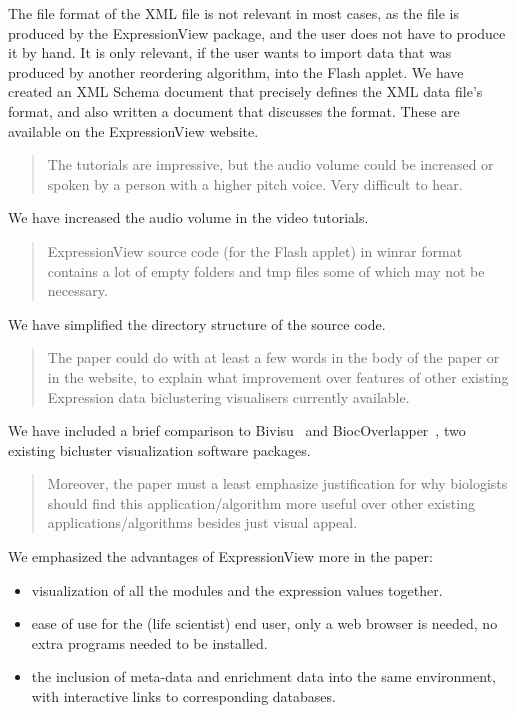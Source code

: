 \documentclass[a4paper]{article}
\newenvironment{myquote}{\begin{quote}\color{blue}}{\end{quote}}
\begin{document}
The file format of the XML file is not relevant in most cases, as the
file is produced by the ExpressionView package, and the user does not
have to produce it by hand. It is only relevant, if the user wants to
import data that was produced by another reordering algorithm, into
the Flash applet. We have created an XML Schema document that precisely
defines the XML data file's format, and also written a document that
discusses the format. These are available on the ExpressionView website.

\begin{myquote}
The tutorials are impressive, but the audio volume could be increased
or spoken by a person with a higher pitch voice. Very difficult to
hear.  
\end{myquote}

We have increased the audio volume in the video tutorials.

\begin{myquote}
ExpressionView source code (for the Flash applet) in winrar
format contains a lot of empty folders and tmp files some of which may
not be necessary. 
\end{myquote}

We have simplified the directory structure of the source code.

\begin{myquote}
The paper could do with at least a few words in the body of the paper
or in the website, to explain what improvement over features of other
existing Expression data biclustering visualisers currently
available. 
\end{myquote}

We have included a brief comparison to Bivisu~\citep{cheng07} and
BiocOverlapper~\citep{santamaria08}, two existing bicluster
visualization software packages.

\begin{myquote}
Moreover, the paper must a least emphasize justification
for why biologists should find this application/algorithm more useful
over other existing applications/algorithms besides just visual
appeal. 
\end{myquote}

We emphasized the advantages of ExpressionView more in the paper:
\begin{itemize}
\item visualization of all the modules and the expression values together.
\item ease of use for the (life scientist) end user, only a web browser is
  needed, no extra programs needed to be installed.
\item the inclusion of meta-data and enrichment data into the same
  environment, with interactive links to corresponding databases.
\end{itemize}
\end{document}
